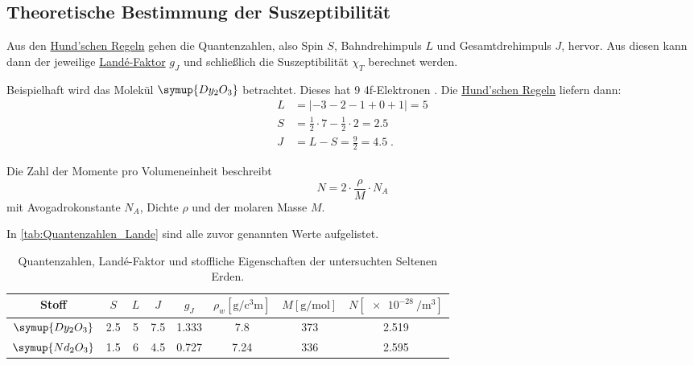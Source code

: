 \subsection{Theoretische Bestimmung der Suszeptibilität}
\label{sec:auswertung:chi_T}

Aus den \hyperref[Hundsche_Regeln]{Hund'schen Regeln} gehen die Quantenzahlen,
also Spin $S$, Bahndrehimpuls $L$ und Gesamtdrehimpuls $J$,
hervor.
Aus diesen kann dann der jeweilige \hyperref[eqn:Lande_Faktor]{Landé-Faktor} $g_J$
und schließlich die Suszeptibilität $\chi_T$ berechnet werden.

Beispielhaft wird das Molekül $\symup{Dy_2O_3}$ betrachtet.
Dieses hat 9 4f-Elektronen \cite{versuchsanleitung}.
Die \hyperref[Hundsche_Regeln]{Hund'schen Regeln} liefern dann:
\begin{align*}
  L &= \lvert -3 -2 -1 +0 +1 \lvert = 5 \\
  S &= \frac{1}{2} \cdot 7 - \frac{1}{2} \cdot 2 = \num{2.5} \\
  J &= L - S = \frac{9}{2} = \num{4.5} \; .
\end{align*}

Die Zahl der Momente pro Volumeneinheit beschreibt
\begin{equation*}
  N = 2 \cdot \frac{\rho}{M} \cdot N_A
\end{equation*}
mit Avogadrokonstante $N_A$, Dichte $\rho$ und der molaren Masse $M$.

In \autoref{tab:Quantenzahlen_Lande} sind alle zuvor genannten Werte aufgelistet.

\begin{table}[H]
  \centering
  \caption{Quantenzahlen, Landé-Faktor und stoffliche Eigenschaften der untersuchten Seltenen Erden.}
  \label{tab:Quantenzahlen_Lande}
  \begin{tabular}{c S S S S c c S}
  \toprule
  Stoff &
  $S$ &
  $L$ &
  $J$ &
  $g_J$ &
  $\rho_w [\si{\gram\per\cubic\centi\meter}]$ &
  $M [\si{\gram\per\mol}]$ &
  $N [\SI{e-28}{\per\cubic\meter}]$ \\
  \midrule
  $\symup{Dy_2O_3}$ & 2.5 & 5 & 7.5 & 1.333 & \num{7.8}  \cite{versuchsanleitung} & \num{373} \cite{molmasse_Dy_2O_3} & 2.519 \\
  $\symup{Nd_2O_3}$ & 1.5 & 6 & 4.5 & 0.727 & \num{7.24} \cite{versuchsanleitung} & \num{336} \cite{molmasse_Nd_2O_3} & 2.595 \\
  \bottomrule
  \end{tabular}
\end{table}

